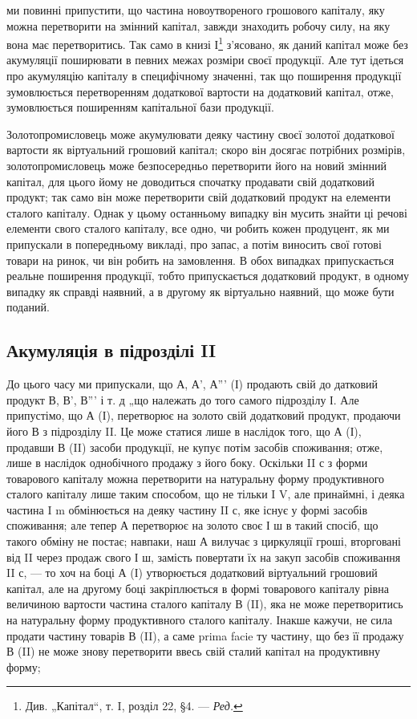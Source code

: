\parcont{}  %
ми повинні припустити, що частина новоутвореного грошового капіталу,
яку можна перетворити на змінний капітал, завжди знаходить робочу
силу, на яку вона має перетворитись. Так само в книзі І\footnote*{
Див. „Капітал“, т. I, розділ 22, §4. — \emph{Ред.}
} з’ясовано,
як даний капітал може без акумуляції поширювати в певних межах розміри
своєї продукції. Але тут ідеться про акумуляцію капіталу в специфічному
значенні, так що поширення продукції зумовлюється перетворенням
додаткової вартости на додатковий капітал, отже, зумовлюється
поширенням капітальної бази продукції.

Золотопромисловець може акумулювати деяку частину своєї золотої
додаткової вартости як віртуальний грошовий капітал; скоро він досягає
потрібних розмірів, золотопромисловець може безпосередньо перетворити
його на новий змінний капітал, для цього йому не доводиться спочатку
продавати свій додатковий продукт; так само він може перетворити свій
додатковий продукт на елементи сталого капіталу. Однак у цьому останньому
випадку він мусить знайти ці речові елементи свого сталого капіталу,
все одно, чи робить кожен продуцент, як ми припускали в попередньому
викладі, про запас, а потім виносить свої готові товари на ринок,
чи він робить на замовлення. В обох випадках припускається реальне
поширення продукції, тобто припускається додатковий продукт, в
одному випадку як справді наявний, а в другому як віртуально наявний,
що може бути поданий.

\subsection{Акумуляція в підрозділі II}

До цього часу ми припускали, що А, А', А''' (І) продають свій до
датковий продукт В, В', В''' і т. д „що належать до того самого підрозділу
І. Але припустімо, що А (І), перетворює на золото свій додатковий
продукт, продаючи його В з підрозділу II. Це може статися
лише в наслідок того, що А (І), продавши В (II) засоби продукції,
не купує потім засобів споживання; отже, лише в наслідок однобічного
продажу з його боку. Оскільки II с з форми товарового капіталу можна
перетворити на натуральну форму продуктивного сталого капіталу лише
таким способом, що не тільки I V, але принаймні, і деяка частина I m
обмінюється на деяку частину II с, яке існує у формі засобів споживання;
але тепер А перетворює на золото своє І ш в такий спосіб, що такого
обміну не постає; навпаки, наш А вилучає з циркуляції гроші, вторговані
від II через продаж свого І ш, замість повертати їх на закуп засобів
споживання II с, — то хоч на боці А (І) утворюється додатковий
віртуальний грошовий капітал, але на другому боці закріплюється в формі
товарового капіталу рівна величиною вартости частина сталого капіталу
В (II), яка не може перетворитись на натуральну форму продуктивного
сталого капіталу. Інакше кажучи, не сила продати частину товарів
В (II), а саме prima facie ту частину, що без її продажу В (II) не може
знову перетворити ввесь свій сталий капітал на продуктивну форму;
\parbreak{}  %
